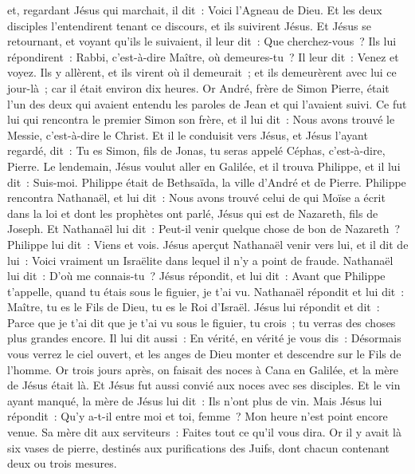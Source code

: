 \begin{multicols}{2}
et, regardant Jésus qui marchait, il dit~: Voici l'Agneau de Dieu.
Et les deux disciples l'entendirent tenant ce discours, et ils suivirent Jésus.
Et Jésus se retournant, et voyant qu'ils le suivaient, il leur dit~: Que cherchez-vous~? Ils lui répondirent~: Rabbi, c'est-à-dire Maître, où demeures-tu~?
Il leur dit~: Venez et voyez. Ils y allèrent, et ils virent où il demeurait~; et ils demeurèrent avec lui ce jour-là~; car il était environ dix heures.
Or André, frère de Simon Pierre, était l'un des deux qui avaient entendu les paroles de Jean et qui l'avaient suivi.
Ce fut lui qui rencontra le premier Simon son frère, et il lui dit~: Nous avons trouvé le Messie, c'est-à-dire le Christ.
Et il le conduisit vers Jésus, et Jésus l'ayant regardé, dit~: Tu es Simon, fils de Jonas, tu seras appelé Céphas, c'est-à-dire, Pierre.
Le lendemain, Jésus voulut aller en Galilée, et il trouva Philippe, et il lui dit~: Suis-moi.
Philippe était de Bethsaïda, la ville d'André et de Pierre.
Philippe rencontra Nathanaël, et lui dit~: Nous avons trouvé celui de qui Moïse a écrit dans la loi et dont les prophètes ont parlé, Jésus qui est de Nazareth, fils de Joseph.
Et Nathanaël lui dit~: Peut-il venir quelque chose de bon de Nazareth~? Philippe lui dit~: Viens et vois.
Jésus aperçut Nathanaël venir vers lui, et il dit de lui~: Voici vraiment un Israëlite dans lequel il n'y a point de fraude.
Nathanaël lui dit~: D'où me connais-tu~? Jésus répondit, et lui dit~: Avant que Philippe t'appelle, quand tu étais sous le figuier, je t'ai vu.
Nathanaël répondit et lui dit~: Maître, tu es le Fils de Dieu, tu es le Roi d'Israël.
Jésus lui répondit et dit~: Parce que je t'ai dit que je t'ai vu sous le figuier, tu crois~; tu verras des choses plus grandes encore.
Il lui dit aussi~: En vérité, en vérité je vous dis~: Désormais vous verrez le ciel ouvert, et les anges de Dieu monter et descendre sur le Fils de l'homme.
\VerseOne{}Or trois jours après, on faisait des noces à Cana en Galilée, et la mère de Jésus était là.
Et Jésus fut aussi convié aux noces avec ses disciples.
Et le vin ayant manqué, la mère de Jésus lui dit~: Ils n'ont plus de vin.
Mais Jésus lui répondit~: Qu'y a-t-il entre moi et toi, femme~? Mon heure n'est point encore venue.
Sa mère dit aux serviteurs~: Faites tout ce qu'il vous dira.
Or il y avait là six vases de pierre, destinés aux purifications des Juifs, dont chacun contenant deux ou trois mesures.

\end{multicols}
